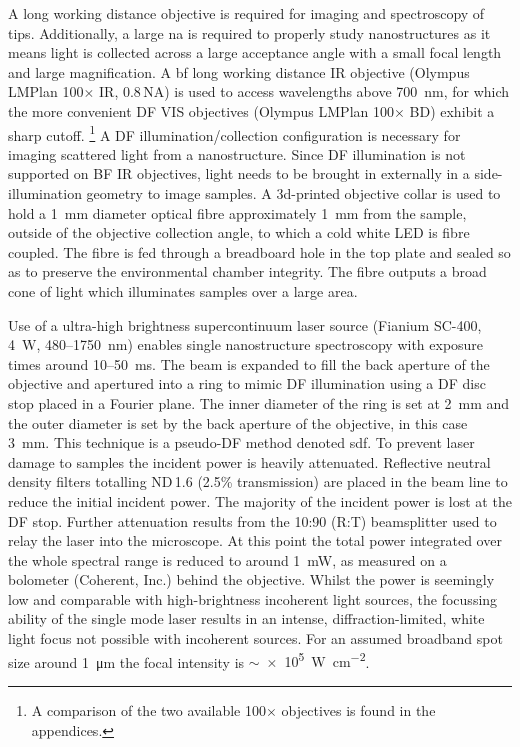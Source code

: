 \documentclass{article}
\begin{document}
A long working distance objective is required for imaging and spectroscopy of tips. Additionally, a large \gls{na} is required to properly study nanostructures as it means light is collected across a large acceptance angle with a small focal length and large magnification. A \gls{bf} long working distance IR objective (Olympus LMPlan 100$\times$ IR, 0.8\,NA) is used to access wavelengths above \SI{700}{nm}, for which the more convenient DF VIS objectives (Olympus LMPlan 100$\times$ BD) exhibit a sharp cutoff.%
\footnote{A comparison of the two available 100$\times$ objectives is found in the appendices.}
A DF illumination/collection configuration is necessary for imaging scattered light from a nanostructure. Since DF illumination is not supported on BF IR objectives, light needs to be brought in externally in a side-illumination geometry to image samples. A 3d-printed objective collar is used to hold a \SI{1}{mm} diameter optical fibre approximately \SI{1}{mm} from the sample, outside of the objective collection angle, to which a cold white LED is fibre coupled. The fibre is fed through a breadboard hole in the top plate and sealed so as to preserve the environmental chamber integrity. The fibre outputs a broad cone of light which illuminates samples over a large area.

Use of a ultra-high brightness supercontinuum laser source (Fianium SC-400, \SI{4}{W}, 480--\SI{1750}{nm}) enables single nanostructure spectroscopy with exposure times around 10--\SI{50}{ms}. The beam is expanded to fill the back aperture of the objective and apertured into a ring to mimic DF illumination using a DF disc stop placed in a Fourier plane. The inner diameter of the ring is set at \SI{2}{mm} and the outer diameter is set by the back aperture of the objective, in this case \SI{3}{mm}. This technique is a pseudo-DF method denoted \gls{sdf}. %
To prevent laser damage to samples the incident power is heavily attenuated. Reflective neutral density filters totalling ND\,1.6 (2.5\% transmission) are placed in the beam line to reduce the initial incident power. The majority of the incident power is lost at the DF stop. Further attenuation results from the 10:90 (R:T) beamsplitter used to relay the laser into the microscope. At this point the total power integrated over the whole spectral range is reduced to around \SI{1}{mW}, as measured on a bolometer (Coherent, Inc.) behind the objective. Whilst the power is seemingly low and comparable with high-brightness incoherent light sources, the focussing ability of the single mode laser results in an intense, diffraction-limited, white light focus not possible with incoherent sources. For an assumed broadband spot size around \SI{1}{\micro\metre} the focal intensity is $\sim${\SI{e5}{\watt\per\centi\metre\squared}}.
\end{document}
